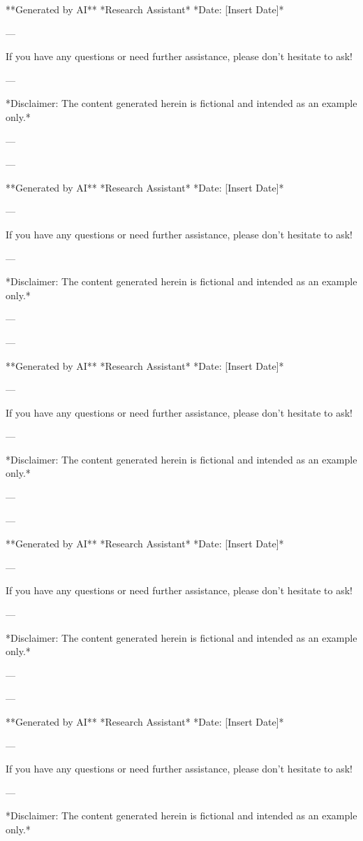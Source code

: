 **Generated by AI** 
*Research Assistant* 
*Date: [Insert Date]*

--- 

If you have any questions or need further assistance, please don't hesitate to ask! 

--- 

*Disclaimer: The content generated herein is fictional and intended as an example only.* 

--- 

--- 

**Generated by AI** 
*Research Assistant* 
*Date: [Insert Date]*

--- 

If you have any questions or need further assistance, please don't hesitate to ask! 

--- 

*Disclaimer: The content generated herein is fictional and intended as an example only.* 

--- 

--- 

**Generated by AI** 
*Research Assistant* 
*Date: [Insert Date]*

--- 

If you have any questions or need further assistance, please don't hesitate to ask! 

--- 

*Disclaimer: The content generated herein is fictional and intended as an example only.* 

--- 

--- 

**Generated by AI** 
*Research Assistant* 
*Date: [Insert Date]*

--- 

If you have any questions or need further assistance, please don't hesitate to ask! 

--- 

*Disclaimer: The content generated herein is fictional and intended as an example only.* 

--- 

--- 

**Generated by AI** 
*Research Assistant* 
*Date: [Insert Date]*

--- 

If you have any questions or need further assistance, please don't hesitate to ask! 

--- 

*Disclaimer: The content generated herein is fictional and intended as an example only.* 

